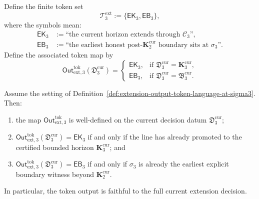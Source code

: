 \begin{definition}
\label{def:extension-output-token-language-at-sigma3}
Define the finite token set
\[
  \mathcal T^{\mathrm{ext}}_3:=\{\mathsf{EK}_3,\mathsf{EB}_3\},
\]
where the symbols mean:
\begin{align*}
  \mathsf{EK}_3 &:= \text{``the current horizon extends through }\mathcal C_3\text{''},\\
  \mathsf{EB}_3 &:= \text{``the earliest honest post-}\mathbf K_2^{\mathrm{cur}}\text{ boundary sits at }\sigma_3\text{''}.
\end{align*}
Define the associated token map by
\[
  \mathsf{Out}^{\mathrm{tok}}_{\mathrm{ext},3}(\mathfrak D_3^{\mathrm{cur}})=
  \begin{cases}
    \mathsf{EK}_3, & \text{if }\mathfrak D_3^{\mathrm{cur}}=\mathbf K_3^{\mathrm{cur}},\\[2mm]
    \mathsf{EB}_3, & \text{if }\mathfrak D_3^{\mathrm{cur}}=\mathfrak B_3^{\mathrm{cur}}.
  \end{cases}
\]
\end{definition}

\begin{proposition}
\label{prop:first-extension-decision-beyond-k2cur-admits-faithful-token-output}
Assume the setting of Definition~\ref{def:extension-output-token-language-at-sigma3}. Then:
\begin{enumerate}[label=(\roman*)]
  \item the map \(\mathsf{Out}^{\mathrm{tok}}_{\mathrm{ext},3}\) is well-defined on the current decision datum \(\mathfrak D_3^{\mathrm{cur}}\);
  \item \(\mathsf{Out}^{\mathrm{tok}}_{\mathrm{ext},3}(\mathfrak D_3^{\mathrm{cur}})=\mathsf{EK}_3\) if and only if the line has already promoted to the certified bounded horizon \(\mathbf K_3^{\mathrm{cur}}\); and
  \item \(\mathsf{Out}^{\mathrm{tok}}_{\mathrm{ext},3}(\mathfrak D_3^{\mathrm{cur}})=\mathsf{EB}_3\) if and only if \(\sigma_3\) is already the earliest explicit boundary witness beyond \(\mathbf K_2^{\mathrm{cur}}\).
\end{enumerate}
In particular, the token output is faithful to the full current extension decision.
\end{proposition}

